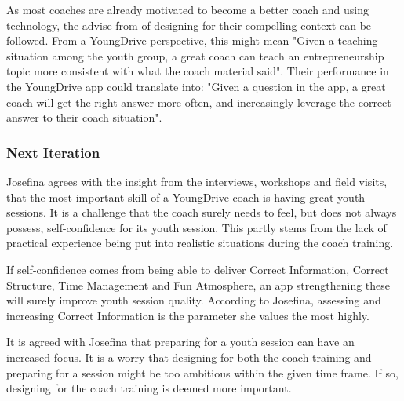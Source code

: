 As most coaches are already motivated to become a better coach and using technology, the advise from \cite{sierra} of designing for their compelling context can be followed. From a YoungDrive perspective, this might mean "Given a teaching situation among the youth group, a great coach can teach an entrepreneurship topic more consistent with what the coach material said". Their performance in the YoungDrive app could translate into: "Given a question in the app, a great coach will get the right answer more often, and increasingly leverage the correct answer to their coach situation".

\subsubsection{Next Iteration}
Josefina agrees with the insight from the interviews, workshops and field visits, that the most important skill of a YoungDrive coach is having great youth sessions. It is a challenge that the coach surely needs to feel, but does not always possess, self-confidence for its youth session. This partly stems from the lack of practical experience being put into realistic situations during the coach training.


If self-confidence comes from being able to deliver Correct Information, Correct Structure, Time Management and Fun Atmosphere, an app strengthening these will surely improve youth session quality. According to Josefina, assessing and increasing Correct Information is the parameter she values the most highly.

It is agreed with Josefina that preparing for a youth session can have an increased focus. It is a worry that designing for both the coach training and preparing for a session might be too ambitious within the given time frame. If so, designing for the coach training is deemed more important.
